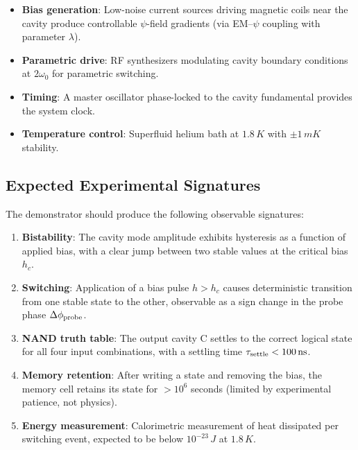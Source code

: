 \documentclass[12pt,a4paper,twoside]{article}
\begin{document}
\begin{itemize}
\item \textbf{Bias generation}: Low-noise current sources driving magnetic coils near the cavity produce controllable $\psi$-field gradients (via EM--$\psi$ coupling with parameter $\lambda$).
\item \textbf{Parametric drive}: RF synthesizers modulating cavity boundary conditions at $2\omega_0$ for parametric switching.
\item \textbf{Timing}: A master oscillator phase-locked to the cavity fundamental provides the system clock.
\item \textbf{Temperature control}: Superfluid helium bath at $1.8\,\si{K}$ with $\pm 1\,\si{mK}$ stability.
\end{itemize}

\subsection{Expected Experimental Signatures}\label{sec:signatures}

The demonstrator should produce the following observable signatures:

\begin{enumerate}
\item \textbf{Bistability}: The cavity mode amplitude exhibits hysteresis as a function of applied bias, with a clear jump between two stable values at the critical bias $h_c$.

\item \textbf{Switching}: Application of a bias pulse $h > h_c$ causes deterministic transition from one stable state to the other, observable as a sign change in the probe phase $\Delta\phi_{\rm probe}$.

\item \textbf{NAND truth table}: The output cavity C settles to the correct logical state for all four input combinations, with a settling time $\tau_{\rm settle} < 100\,\si{ns}$.

\item \textbf{Memory retention}: After writing a state and removing the bias, the memory cell retains its state for $> 10^6$ seconds (limited by experimental patience, not physics).

\item \textbf{Energy measurement}: Calorimetric measurement of heat dissipated per switching event, expected to be below $10^{-23}\,\si{J}$ at $1.8\,\si{K}$.
\end{enumerate}
\end{document}
